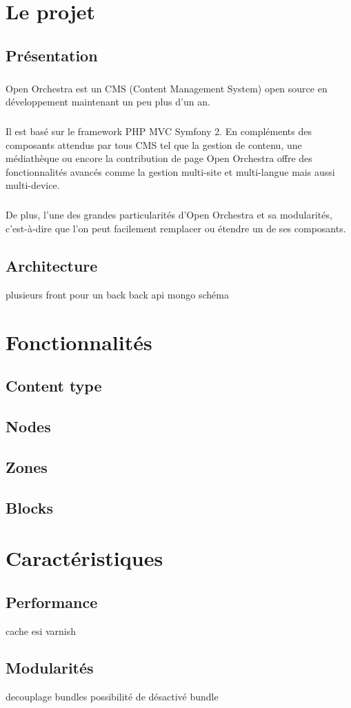 \chapter{Le projet}
\section{Présentation}
        \paragraph{}
        Open Orchestra est un CMS (Content Management  System) open source en développement maintenant un peu plus d'un an. 
        \paragraph{}
        Il est basé sur le framework PHP MVC Symfony 2. En compléments des composants attendus par tous CMS tel que la gestion de contenu, une médiathèque ou encore la contribution de page Open Orchestra offre des fonctionnalités avancés comme la gestion multi-site et multi-langue mais aussi multi-device.
        \paragraph{}
        De plus, l'une des grandes particularités d'Open Orchestra et sa modularités, c'est-à-dire que l'on peut facilement remplacer ou étendre un de ses composants.
        \section{Architecture}
        plusieurs front pour un back 
        back api 
        mongo 
        schéma

   
\chapter{Fonctionnalités}
         \section{Content type}
          \section{Nodes}  
          \section{Zones}  
          \section{Blocks}  
\chapter{Caractéristiques}
   \section{Performance}
   cache esi
   varnish 
   \section{Modularités}
   decouplage bundles
   possibilité de désactivé bundle
        
        
        